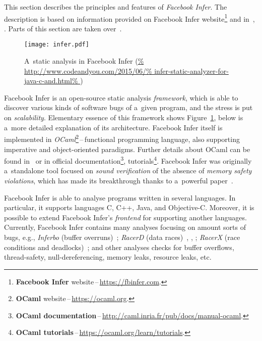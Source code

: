 This section describes the principles and features of
\emph{Facebook Infer}. The description is based on information provided
on Facebook Infer website\footnote{\textbf{Facebook Infer}
website\,--\,\url{https://fbinfer.com}.} and in~\cite{inferAISlides},
\cite{projectPracticeMarcin2018}. Parts of this section are taken
over~\cite{excel2019FBInfer}.

\begin{figure}[hbt]
    \centering
    \texttt{[image: infer.pdf]}
    \caption{
        A~static analysis in Facebook Infer
        (\url{%
            http://www.codeandyou.com/2015/06/%
            infer-static-analyzer-for-java-c-and.html%
        })
    }
    \label{fig:infer}
\end{figure}

Facebook Infer is an open-source static analysis \emph{framework},
which is able to discover various kinds of software bugs of a~given
program, and the stress is put on \emph{scalability}.
Elementary essence of this framework shows Figure~\ref{fig:infer}, below
is a~more detailed explanation of its architecture. Facebook Infer
itself is implemented in \emph{OCaml}\footnote{\textbf{OCaml}
website\,--\,\url{https://ocaml.org}.}\,--\,functional programming
language, also supporting imperative and object-oriented paradigms. Further
details about OCaml can be found in~\cite{realWorldOCaml} or in
official documentation\footnote{\textbf{OCaml
documentation}\,--\,\url{http://caml.inria.fr/pub/docs/manual-ocaml}.},
tutorials\footnote{\textbf{OCaml
tutorials}\,--\,\url{https://ocaml.org/learn/tutorials}.}. Facebook Infer was
originally a~standalone tool focused on \emph{sound verification} of
the absence of \emph{memory safety violations}, which has made its breakthrough
thanks to a~powerful paper~\cite{inferBiabduction}.

Facebook Infer is able to analyse programs written in several languages.
In particular, it supports languages C, C++, Java, and Objective-C. Moreover,
it is possible to extend Facebook Infer's \emph{frontend} for supporting
another languages. Currently, Facebook Infer contains many analyses focusing
on amount sorts of bugs, e.g., \emph{Inferbo} (buffer
overruns)~\cite{inferboOnline}; \emph{RacerD} (data races)~\cite{racerD},
\cite{racerDOnline}, \cite{staticRaceDetectorTruePositive}; \emph{RacerX}
(race conditions and deadlocks)~\cite{racerX}; and other analyses checks
for buffer overflows, thread-safety, null-dereferencing, memory leaks,
resource leaks, etc.



